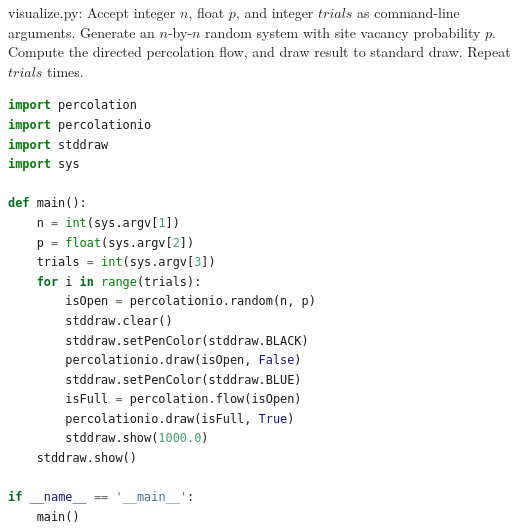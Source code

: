 \documentclass[8pt,a4paper,compress]{beamer}
\begin{document}
\begin{frame}[fragile]
\pause

\begin{framed}
\tiny visualize.py: Accept integer $n$, float $p$, and integer $trials$ as command-line arguments. Generate an $n$-by-$n$ random system with site vacancy probability $p$. Compute the directed percolation flow, and draw result to standard draw. Repeat $trials$ times.
\end{framed}

\begin{lstlisting}[language=Python]
import percolation
import percolationio
import stddraw
import sys

def main():
    n = int(sys.argv[1])
    p = float(sys.argv[2])
    trials = int(sys.argv[3])
    for i in range(trials):
        isOpen = percolationio.random(n, p)
        stddraw.clear()
        stddraw.setPenColor(stddraw.BLACK)
        percolationio.draw(isOpen, False)
        stddraw.setPenColor(stddraw.BLUE)
        isFull = percolation.flow(isOpen)
        percolationio.draw(isFull, True)
        stddraw.show(1000.0)
    stddraw.show()

if __name__ == '__main__':
    main()
\end{lstlisting}
\end{frame}
\end{document}

